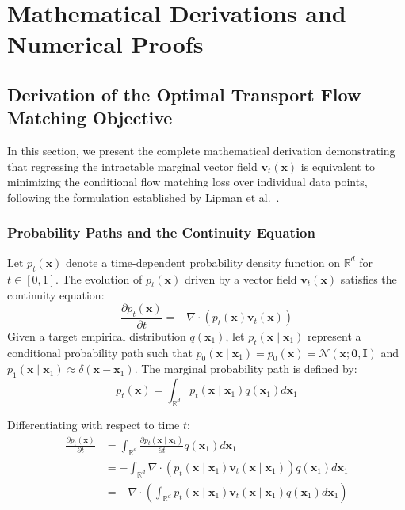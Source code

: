 \chapter{Mathematical Derivations and Numerical Proofs}
\label{AppendixA}

\section{Derivation of the Optimal Transport Flow Matching Objective}
In this section, we present the complete mathematical derivation demonstrating that regressing the intractable marginal vector field $\mathbf{v}_t(\mathbf{x})$ is equivalent to minimizing the conditional flow matching loss over individual data points, following the formulation established by Lipman et al.~\cite{lipman2022flow}.

\subsection{Probability Paths and the Continuity Equation}
Let $p_t(\mathbf{x})$ denote a time-dependent probability density function on $\mathbb{R}^d$ for $t \in [0, 1]$. The evolution of $p_t(\mathbf{x})$ driven by a vector field $\mathbf{v}_t(\mathbf{x})$ satisfies the continuity equation:
\begin{equation}
    \frac{\partial p_t(\mathbf{x})}{\partial t} = -\nabla \cdot \left( p_t(\mathbf{x}) \mathbf{v}_t(\mathbf{x}) \right)
    \label{eq:app_continuity}
\end{equation}
Given a target empirical distribution $q(\mathbf{x}_1)$, let $p_t(\mathbf{x} \mid \mathbf{x}_1)$ represent a conditional probability path such that $p_0(\mathbf{x} \mid \mathbf{x}_1) = p_0(\mathbf{x}) = \mathcal{N}(\mathbf{x}; \mathbf{0}, \mathbf{I})$ and $p_1(\mathbf{x} \mid \mathbf{x}_1) \approx \delta(\mathbf{x} - \mathbf{x}_1)$. The marginal probability path is defined by:
\begin{equation}
    p_t(\mathbf{x}) = \int_{\mathbb{R}^d} p_t(\mathbf{x} \mid \mathbf{x}_1) q(\mathbf{x}_1) d\mathbf{x}_1
    \label{eq:app_marginal_density}
\end{equation}

Differentiating  with respect to time $t$:
\begin{align}
    \frac{\partial p_t(\mathbf{x})}{\partial t} &= \int_{\mathbb{R}^d} \frac{\partial p_t(\mathbf{x} \mid \mathbf{x}_1)}{\partial t} q(\mathbf{x}_1) d\mathbf{x}_1 \nonumber \\
    &= -\int_{\mathbb{R}^d} \nabla \cdot \left( p_t(\mathbf{x} \mid \mathbf{x}_1) \mathbf{v}_t(\mathbf{x} \mid \mathbf{x}_1) \right) q(\mathbf{x}_1) d\mathbf{x}_1 \nonumber \\
    &= -\nabla \cdot \left( \int_{\mathbb{R}^d} p_t(\mathbf{x} \mid \mathbf{x}_1) \mathbf{v}_t(\mathbf{x} \mid \mathbf{x}_1) q(\mathbf{x}_1) d\mathbf{x}_1 \right)
    \label{eq:app_continuity_expansion}
\end{align}

